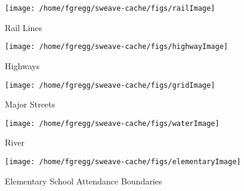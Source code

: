 \documentclass[12pt,letter]{article}\usepackage[]{graphicx}\usepackage[]{color}
\makeatletter
\def\maxwidth{ %
  \ifdim\Gin@nat@width>\linewidth
    \linewidth
  \else
    \Gin@nat@width
  \fi
}
\newenvironment{knitrout}{}{} %
\makeatother
\begin{document}
\begin{figure}
\begin{knitrout}
\color{fgcolor}

{\centering \texttt{[image: /home/fgregg/sweave-cache/figs/railImage]} 

}



\end{knitrout}

\caption{Rail Lines}
\end{figure}

\begin{figure}
\begin{knitrout}
\color{fgcolor}

{\centering \texttt{[image: /home/fgregg/sweave-cache/figs/highwayImage]} 

}



\end{knitrout}

\caption{Highways}
\end{figure}

\begin{figure}
\begin{knitrout}
\color{fgcolor}

{\centering \texttt{[image: /home/fgregg/sweave-cache/figs/gridImage]} 

}



\end{knitrout}

\caption{Major Streets}
\end{figure}

\begin{figure}
\begin{knitrout}
\color{fgcolor}

{\centering \texttt{[image: /home/fgregg/sweave-cache/figs/waterImage]} 

}



\end{knitrout}

\caption{River}
\end{figure}

\begin{figure}
\begin{knitrout}
\color{fgcolor}

{\centering \texttt{[image: /home/fgregg/sweave-cache/figs/elementaryImage]} 

}



\end{knitrout}

\caption{Elementary School Attendance Boundaries}
\end{figure}
\end{document}

